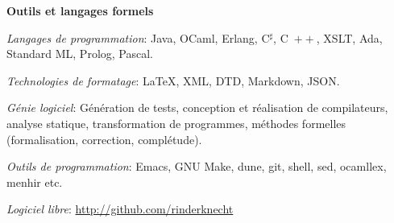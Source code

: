 \documentclass[a4paper,11pt]{article}
\newcommand{\cpp}{\mbox{C \hspace*{-2.5mm} \raise 0.7mm \hbox{${\scriptscriptstyle ++}$}}}
\begin{document}
\noindent\textbf{\large Outils et langages formels}
\medskip
\begin{itemize*}

  \item \textit{Langages de programmation}: Java, OCaml, Erlang,
    C$^\sharp$, \cpp, XSLT, Ada, Standard ML, Prolog, Pascal.

  \item \textit{Technologies de formatage}: \LaTeX, XML, DTD, Markdown,
    JSON.


  \item \textit{Génie logiciel}: Génération de tests, conception et
    réalisation de compilateurs, analyse statique, transformation de
    programmes, méthodes formelles (formalisation, correction,
    complétude).



  \item \textit{Outils de programmation}: Emacs, GNU Make, dune, git,
    shell, sed, ocamllex, menhir etc.

  \item \textit{Logiciel libre}: \url{http://github.com/rinderknecht}


\end{itemize*}
\end{document}
